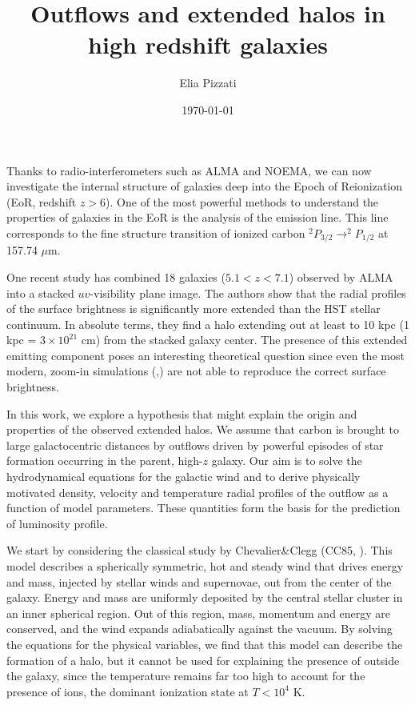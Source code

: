 \documentclass[a4paper, 11pt]{article}
\title{Outflows and extended \CII halos in high redshift galaxies}
\author{Elia Pizzati}
\date{\today}
\begin{document}
	\maketitle
Thanks to radio-interferometers such as ALMA and NOEMA, we can now investigate the internal structure of galaxies deep into the Epoch of Reionization (EoR, redshift $z>6$).  One of the most powerful methods to understand the properties of galaxies in the EoR is the analysis of the \CII emission line. This line corresponds to the fine structure transition of ionized carbon $^2P_{3/2} \rightarrow ^2P_{1/2}$ at 157.74 $\mu$m.


One recent study \cite{Fujimoto19} has combined 18 galaxies ($5.1 < z < 7.1$) observed by ALMA into a stacked $uv$-visibility plane image. The authors show that the radial profiles of the \CII surface brightness is significantly more extended than the HST stellar continuum. In absolute terms, they find a \CII halo extending out at least to 10 kpc (1 kpc = $3\times 10^{21}$ cm) from the stacked galaxy center. The presence of this extended \CII emitting component poses an interesting theoretical question since even the most modern, zoom-in simulations (\cite{pallottini:2019},\cite{Arata18}) are not able to reproduce the correct \CII surface brightness. 


In this work, we explore a hypothesis that might explain the origin and properties of the observed extended \CII halos. We assume that carbon is brought to large galactocentric distances by outflows driven by powerful episodes of star formation occurring in the parent, high-$z$ galaxy. Our aim is to solve the hydrodynamical equations for the galactic wind and to derive physically motivated density, velocity and temperature radial profiles of the outflow as a function of model parameters. These quantities form the basis for the prediction of \CII luminosity profile.


We start by considering the classical study by Chevalier\&Clegg (CC85, \cite{chevalier_clegg:1985}). This model describes a spherically symmetric, hot and steady wind that drives energy and mass, injected by stellar winds and supernovae, out from the center of the galaxy. Energy and mass are uniformly deposited by the central stellar cluster in an inner spherical region. Out of this region, mass, momentum and energy are conserved, and the wind expands adiabatically against the vacuum. By solving the equations for the physical variables, we find that this model can describe the formation of a halo, but it cannot be used for explaining the presence of \CIIion outside the galaxy, since the temperature remains far too high to account for the presence of \CIIion ions, the dominant ionization state at $T < 10^4$ K.
\end{document}
